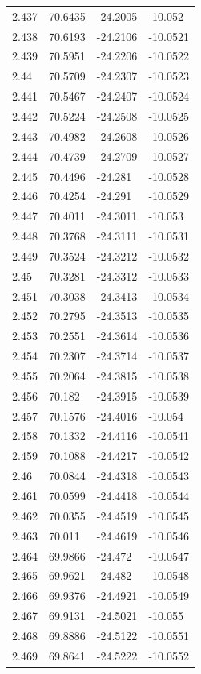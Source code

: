 \begin{tabular}{llll}
2.437 & 70.6435 & -24.2005 & -10.052 \\
2.438 & 70.6193 & -24.2106 & -10.0521 \\
2.439 & 70.5951 & -24.2206 & -10.0522 \\
2.44 & 70.5709 & -24.2307 & -10.0523 \\
2.441 & 70.5467 & -24.2407 & -10.0524 \\
2.442 & 70.5224 & -24.2508 & -10.0525 \\
2.443 & 70.4982 & -24.2608 & -10.0526 \\
2.444 & 70.4739 & -24.2709 & -10.0527 \\
2.445 & 70.4496 & -24.281 & -10.0528 \\
2.446 & 70.4254 & -24.291 & -10.0529 \\
2.447 & 70.4011 & -24.3011 & -10.053 \\
2.448 & 70.3768 & -24.3111 & -10.0531 \\
2.449 & 70.3524 & -24.3212 & -10.0532 \\
2.45 & 70.3281 & -24.3312 & -10.0533 \\
2.451 & 70.3038 & -24.3413 & -10.0534 \\
2.452 & 70.2795 & -24.3513 & -10.0535 \\
2.453 & 70.2551 & -24.3614 & -10.0536 \\
2.454 & 70.2307 & -24.3714 & -10.0537 \\
2.455 & 70.2064 & -24.3815 & -10.0538 \\
2.456 & 70.182 & -24.3915 & -10.0539 \\
2.457 & 70.1576 & -24.4016 & -10.054 \\
2.458 & 70.1332 & -24.4116 & -10.0541 \\
2.459 & 70.1088 & -24.4217 & -10.0542 \\
2.46 & 70.0844 & -24.4318 & -10.0543 \\
2.461 & 70.0599 & -24.4418 & -10.0544 \\
2.462 & 70.0355 & -24.4519 & -10.0545 \\
2.463 & 70.011 & -24.4619 & -10.0546 \\
2.464 & 69.9866 & -24.472 & -10.0547 \\
2.465 & 69.9621 & -24.482 & -10.0548 \\
2.466 & 69.9376 & -24.4921 & -10.0549 \\
2.467 & 69.9131 & -24.5021 & -10.055 \\
2.468 & 69.8886 & -24.5122 & -10.0551 \\
2.469 & 69.8641 & -24.5222 & -10.0552 \\

\end{tabular}
